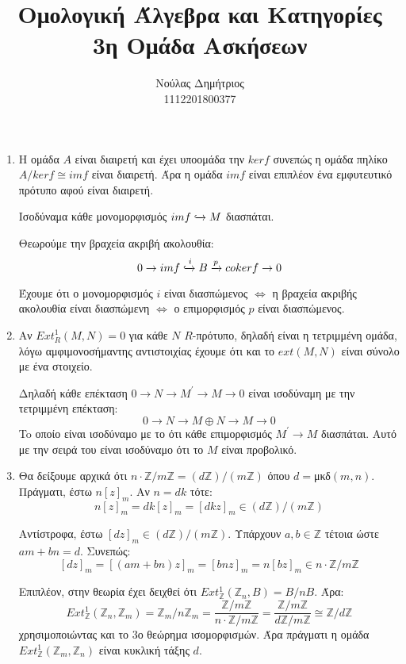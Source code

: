 \documentclass{article}
\title{\textbf{Ομολογική Άλγεβρα και Κατηγορίες} \\ 3η Ομάδα Ασκήσεων}
\author{Νούλας Δημήτριος \\ 1112201800377}
\newcommand{\Z}{\mathbb{Z}}
\begin{document}
\maketitle


\begin{enumerate}
	
	\item Η ομάδα $A$ είναι διαιρετή και έχει υποομάδα την $kerf$ συνεπώς η ομάδα πηλίκο $A /kerf \cong imf$ είναι διαιρετή. Άρα η ομάδα $imf$ είναι επιπλέον ένα εμφυτευτικό πρότυπο αφού είναι διαιρετή.

		Ισοδύναμα κάθε μονομορφισμός $imf \xhookrightarrow{} M$ διασπάται.

		Θεωρούμε την βραχεία ακριβή ακολουθία:
		$$ 0 \rightarrow imf \xhookrightarrow{i} B \xrightarrow{p} cokerf \rightarrow 0$$

		Έχουμε ότι ο μονομορφισμός $i$ είναι διασπώμενος $\iff$ η βραχεία ακριβής ακολουθία είναι διασπώμενη $\iff$ ο επιμορφισμός $p$ είναι διασπώμενος.
	$ $\newline
	

	\item Αν $Ext_{R}^1 (M,N)=0$ για κάθε $N$ $R$-πρότυπο, δηλαδή είναι η τετριμμένη ομάδα, λόγω αμφιμονοσήμαντης αντιστοιχίας έχουμε ότι και το $ext(M,N)$ είναι σύνολο με ένα στοιχείο.

		Δηλαδή κάθε επέκταση $0 \rightarrow N \rightarrow M^{\prime} \rightarrow M \rightarrow 0$ είναι ισοδύναμη με την τετριμμένη επέκταση:
		$$0 \rightarrow N \rightarrow M\oplus N \rightarrow M \rightarrow 0$$
		To οποίο είναι ισοδύναμο με το ότι κάθε επιμορφισμός $M^{\prime} \rightarrow M$ διασπάται. Aυτό με την σειρά του είναι ισοδύναμο ότι το $M$ είναι προβολικό.
$ $\newline


	\item Θα δείξουμε αρχικά ότι $n \cdot \Z / m\Z = (d\Z ) / (m \Z)$ όπου $d = $μκδ$(m,n)$. Πράγματι, έστω $n [z]_m$. Αν $n=dk$ τότε:
		$$n [z]_m = dk[z]_m = [dkz]_m \in (d\Z ) / (m\Z )$$

		Αντίστροφα, έστω $[dz]_m \in (d\Z ) / (m\Z)$. Υπάρχουν $a,b \in \Z$ τέτοια ώστε $am+bn=d$. Συνεπώς:
		$$[dz]_m = [(am + bn)z]_m = [bnz]_m = n [bz]_m \in n \cdot \Z / m\Z$$

		Επιπλέον, στην θεωρία έχει δειχθεί ότι $Ext_{\Z}^1 (\Z_n, B) = B / nB$. Άρα:
		$$Ext_{\Z}^1 (\Z_n , \Z_m) = \Z_m / n \Z_m = \frac{\Z / m\Z}{ n \cdot \Z / m\Z} = \frac{\Z / m \Z}{d\Z / m\Z} \cong \Z / d\Z $$
		χρησιμοποιώντας και το 3ο θεώρημα ισομορφισμών. Άρα πράγματι η ομάδα $Ext_{\Z}^1(\Z_m , \Z_n)$ είναι κυκλική τάξης $d$.
		$ $\newline


\end{enumerate}
\end{document}
